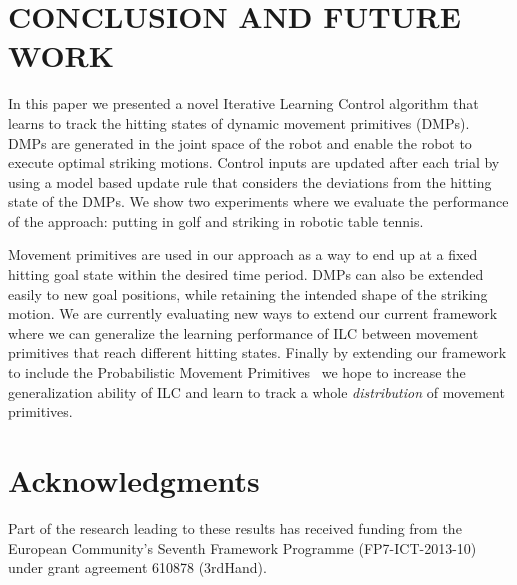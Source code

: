 \section{CONCLUSION AND FUTURE WORK}\label{conclusion}

In this paper we presented a novel Iterative Learning Control algorithm that learns to track the hitting states of dynamic movement primitives (DMPs). %
DMPs are generated in the joint space of the robot and enable the robot to execute optimal striking motions. Control inputs are updated after each trial by using a model based update rule that considers the deviations from the hitting state of the DMPs. We show two experiments where we evaluate the performance of the approach: putting in golf and striking in robotic table tennis. 

Movement primitives are used in our approach as a way to end up at a fixed hitting goal state within the desired time period. DMPs can also be extended easily to new goal positions, while retaining the intended shape of the striking motion. We are currently evaluating new ways to extend our current framework where we can generalize the learning performance of ILC between movement primitives that reach different hitting states. Finally by extending our framework to include the Probabilistic Movement Primitives~\cite{Paraschos13} we hope to increase the generalization ability of ILC and learn to track a whole \emph{distribution} of movement primitives.

%
%

\section{Acknowledgments}

Part of the research leading to these results has received funding from the European Community's Seventh Framework Programme (FP7-ICT-2013-10) under grant agreement 610878 (3rdHand).

